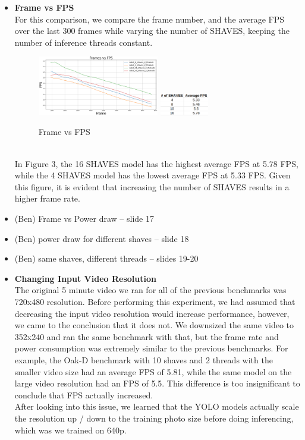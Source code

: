 \documentclass[sigconf,authorversion,nonacm]{acmart}
\begin{document}
\begin{itemize}
    \item \textbf{Frame vs FPS} \\ For this comparison, we compare the frame number, and the average FPS over the last 300 frames while varying the number of SHAVES, keeping the number of inference threads constant.
    \begin{figure}[h] %
        \centering
        \includegraphics[width=0.5\textwidth]{figures/shavesvfps.png}
        \includegraphics[width=0.2\textwidth]{figures/shavesvfpstable.png}
        \caption{Frame vs FPS}
        \label{fig:your_label}
    \end{figure}
    \\ In Figure 3, the 16 SHAVES model has the highest average FPS at 5.78 FPS, while the 4 SHAVES model has the lowest average FPS at 5.33 FPS. Given this figure, it is evident that increasing the number of SHAVES results in a higher frame rate.
    \item (Ben) Frame vs Power draw -- slide 17
    \item (Ben) power draw for different shaves -- slide 18
    \item (Ben) same shaves, different threads -- slides 19-20
    \item \textbf{Changing Input Video Resolution} \\
    The original 5 minute video we ran for all of the previous benchmarks was 720x480 resolution. Before performing this experiment, we had assumed that decreasing the input video resolution would increase performance, however, we came to the conclusion that it does not. We downsized the same video to 352x240 and ran the same benchmark with that, but the frame rate and power consumption was extremely similar to the previous benchmarks. For example, the Oak-D benchmark with 10 shaves and 2 threads with the smaller video size had an average FPS of 5.81, while the same model on the large video resolution had an FPS of 5.5. This difference is too insignificant to conclude that FPS actually increased.\\ After looking into this issue, we learned that the YOLO models actually scale the resolution up / down to the training photo size before doing inferencing, which was we trained on 640p.
\end{itemize}
\end{document}
